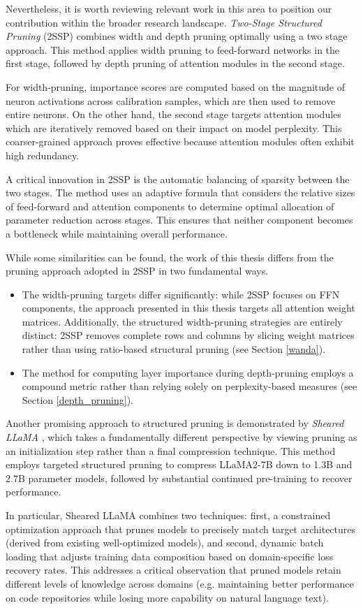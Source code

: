 Nevertheless, it is worth reviewing relevant work in this area to position our contribution within the broader research landscape. \textit{Two-Stage Structured Pruning} (2SSP) \cite{2ssp} combines width and depth pruning optimally using a two stage approach. This method applies width pruning to feed-forward networks in the first stage, followed by depth pruning of attention modules in the second stage.

For width-pruning, importance scores are computed based on the magnitude of neuron activations across calibration samples, which are then used to remove entire neurons. On the other hand, the second stage targets attention modules which are iteratively removed based on their impact on model perplexity. This coarser-grained approach proves effective because attention modules often exhibit high redundancy.

A critical innovation in 2SSP is the automatic balancing of sparsity between the two stages. The method uses an adaptive formula that considers the relative sizes of feed-forward and attention components to determine optimal allocation of parameter reduction across stages. This ensures that neither component becomes a bottleneck while maintaining overall performance.

While some similarities can be found, the work of this thesis differs from the pruning approach adopted in 2SSP in two fundamental ways.
\begin{itemize}
\item The width-pruning targets differ significantly: while 2SSP focuses on FFN components, the approach presented in this thesis targets all attention weight matrices. Additionally, the structured width-pruning strategies are entirely distinct: 2SSP removes complete rows and columns by slicing weight matrices rather than using ratio-based structural pruning (see Section \ref{wanda}).
\item The method for computing layer importance during depth-pruning employs a compound metric rather than relying solely on perplexity-based measures (see Section \ref{depth_pruning}).
\end{itemize}

Another promising approach to structured pruning is demonstrated by \textit{Sheared LLaMA} \cite{sheared_llama}, which takes a fundamentally different perspective by viewing pruning as an initialization step rather than a final compression technique. This method employs targeted structured pruning to compress LLaMA2-7B down to 1.3B and 2.7B parameter models, followed by substantial continued pre-training to recover performance.

In particular, Sheared LLaMA combines two techniques: first, a constrained optimization approach that prunes models to precisely match target architectures (derived from existing well-optimized models), and second, dynamic batch loading that adjusts training data composition based on domain-specific loss recovery rates. This addresses a critical observation that pruned models retain different levels of knowledge across domains (e.g. maintaining better performance on code repositories while losing more capability on natural language text).


